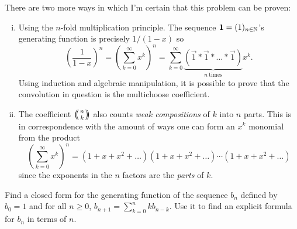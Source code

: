 \documentclass[12pt]{memoir}
\begin{document}
There are two more ways in which I'm certain that this problem can be proven:
\begin{enumerate}[i)]
    \itemsep=-0.4em 
    \item Using the $n$-fold multiplication principle. The sequence $\mathbf{1}=(1)_{n\in\mathbb{N}}$'s generating function is precisely $1/(1-x)$ so 
    $$\left(\frac{1}{1-x}\right)^n=\left(\sum_{k=0}^\infty x^k\right)^n=\sum_{k=0}^\infty \underbrace{(\vec{1}\ast\vec{1}\ast\dots\ast\vec{1})}_{n\ \text{times}}x^k.$$
    Using induction and algebraic manipulation, it is possible to prove that the convolution in question is the multichoose coefficient.
    \item The coefficient $\multinom{n}{k}$ also counts \emph{weak compositions} of $k$ into $n$ parts. This is in correspondence with the amount of ways one can form an $x^k$ monomial from the product
    $$\left(\sum_{k=0}^\infty x^k\right)^n=(1+x+x^2+\dots)(1+x+x^2+\dots)\cdots(1+x+x^2+\dots)$$
    since the exponents in the $n$ factors are the \emph{parts} of $k$.
\end{enumerate}

\begin{Ej}[Exercise 6]
    Find a closed form for the generating function of the sequence $b_n$ defined by $b_0=1$ and for all $n\geq 0$, $b_{n+1}=\sum_{k=0}^nkb_{n-k}$. Use it to find an explicit formula for $b_n$ in terms of $n$.
\end{Ej}
\end{document}
